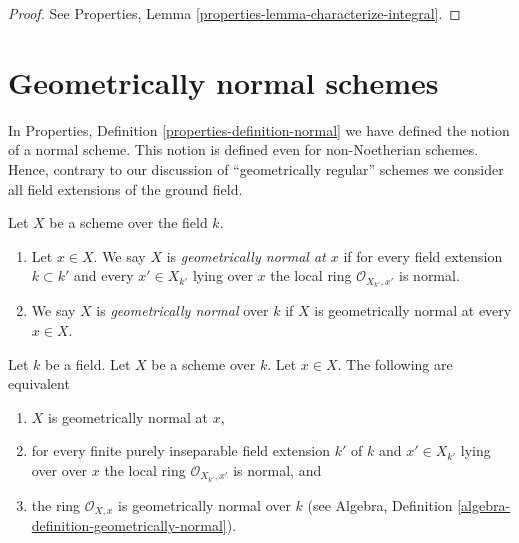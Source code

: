 \begin{proof}
See Properties, Lemma \ref{properties-lemma-characterize-integral}.
\end{proof}





\section{Geometrically normal schemes}
\label{section-geometrically-normal}

\noindent
In Properties, Definition \ref{properties-definition-normal}
we have defined the notion of a normal scheme.
This notion is defined even for non-Noetherian
schemes. Hence, contrary to our discussion of
``geometrically regular'' schemes we consider all
field extensions of the ground field.

\begin{definition}
\label{definition-geometrically-normal}
Let $X$ be a scheme over the field $k$.
\begin{enumerate}
\item Let $x \in X$. We say $X$ is
{\it geometrically normal at $x$} if for every
field extension $k \subset k'$ and every $x' \in X_{k'}$ lying over $x$
the local ring $\mathcal{O}_{X_{k'}, x'}$ is normal.
\item We say $X$ is {\it geometrically normal} over $k$ if $X$
is geometrically normal at every $x \in X$.
\end{enumerate}
\end{definition}

\begin{lemma}
\label{lemma-geometrically-normal-at-point}
Let $k$ be a field.
Let $X$ be a scheme over $k$.
Let $x \in X$.
The following are equivalent
\begin{enumerate}
\item $X$ is geometrically normal at $x$,
\item for every finite purely inseparable field extension $k'$ of $k$
and $x' \in X_{k'}$ lying over over $x$ the local ring
$\mathcal{O}_{X_{k'}, x'}$ is normal, and
\item the ring $\mathcal{O}_{X, x}$ is geometrically
normal over $k$ (see
Algebra, Definition \ref{algebra-definition-geometrically-normal}).
\end{enumerate}
\end{lemma}

